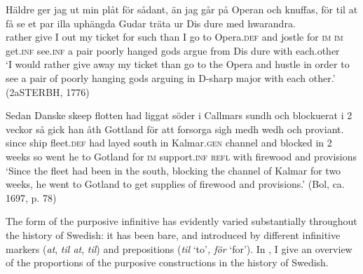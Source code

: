 \documentclass[output=paper]{langscibook}
\begin{document}
\ex  \label{ex:kalm:11c}
\gll Häldre ger jag ut min plåt för sådant, än jag går på Operan och knuffas, för til at få se et par illa uphängda Gudar träta ur Dis dure med hwarandra.\\
rather give I out my ticket for such than I go to Opera.\textsc{def} and jostle for \textsc{im} \textsc{im} get.\textsc{inf} see.\textsc{inf} a pair poorly hanged gods argue from Dis dure with each.other\\
\glt ‘I would rather give away my ticket than go to the Opera and hustle in order to see a pair of poorly hanging gods arguing in D-sharp major with each other.’ (2aSTERBH, 1776)

\ex \label{ex:kalm:11d}
\gll Sedan Danske skeep flotten had liggat söder i Callmars sundh och blockuerat i 2 veckor så gick han åth Gottland för att forsorga sigh medh wedh och proviant.\\
since  ship fleet.\textsc{def} had layed south in Kalmar.\textsc{gen} channel and blocked in 2 weeks so went he to Gotland for \textsc{im} support.\textsc{inf} \textsc{refl} with firewood and provisions\\ 
\glt ‘Since the  fleet had been in the south, blocking the channel of Kalmar for two weeks, he went to Gotland to get supplies of firewood and provisions.’ (Bol, ca. 1697, p. 78)
\z 
\z 


\begin{sloppypar}
The form of the purposive infinitive has evidently varied substantially throughout the history of Swedish: it has been bare, and introduced by different infinitive markers (\textit{at}, \textit{til at}, \textit{til}) and prepositions (\textit{til} ‘to’\textit{, för} ‘for’). In , I give an overview of the proportions of the purposive constructions in the history of Swedish. 
\end{sloppypar}
\end{document}
